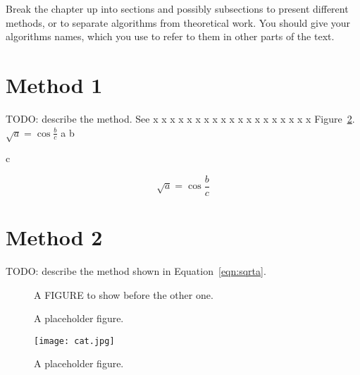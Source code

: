 Break the chapter up into sections and possibly subsections to present different methods, or to separate algorithms from theoretical work.
You should give your algorithms names, which you use to refer to them in other parts of the text.

\section{Method 1}

TODO: describe the method. See x x x x x x x x x x x x x x x x  x x x Figure~\ref{fig:placeholder}. $\sqrt{a}=\cos{\frac{b}{c}}$
a
b

c

\begin{equation}\label{eqn:sqrta}
\sqrt{a}=\cos{\frac{b}{c}}
\end{equation}

\section{Method 2}

TODO: describe the method shown in Equation~\eqref{eqn:sqrta}. \cite{somearticle}

\begin{figure}[ht]
    \centering
    A FIGURE to show before the other one.
    \caption[Short caption as shown in the list of figures.]{A placeholder figure.}
    \label{fig:preplaceholder}
\end{figure}


\begin{figure}[ht]
    \centering
    \texttt{[image: cat.jpg]}  %
    \caption[Placeholder II]{A placeholder figure.}
    \label{fig:placeholder}
\end{figure}
